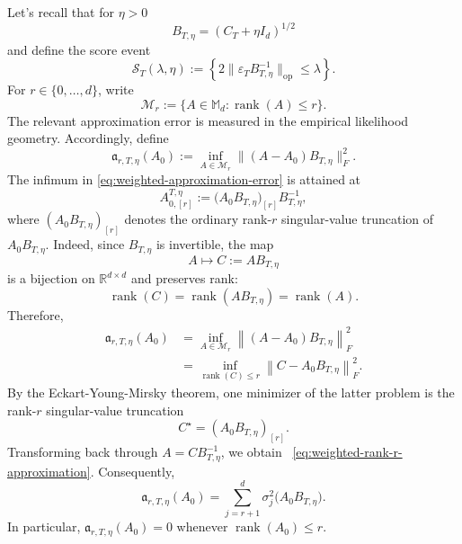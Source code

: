 \documentclass[11pt]{article}
\begin{document}
Let's recall that for $\eta>0$ 
\[
    B_{T,\eta}=(C_T+\eta I_d)^{1/2}
\]
and define the score event
\begin{equation}
    \mathcal S_T(\lambda,\eta)
    :=
    \left\{
        2\big\|\varepsilon_TB_{T,\eta}^{-1}\big\|_{\mathrm{op}}
        \leq\lambda
    \right\}.
\label{eq:score-event}
\end{equation}
For $r\in\{0,\ldots,d\}$, write
\[
    \mathcal M_r
    :=\big\{A\in\mathbb M_d:\operatorname{rank}(A)\leq r\big\}.
\]
The relevant approximation error is measured in the empirical likelihood
geometry. Accordingly, define
\begin{equation}
    \mathfrak a_{r,T,\eta}(A_0)
    :=
    \inf_{A\in\mathcal M_r}
    \big\|(A-A_0)B_{T,\eta}\big\|_F^2.
\label{eq:weighted-approximation-error}
\end{equation}
The infimum in
\eqref{eq:weighted-approximation-error} is attained at
\begin{equation}
    A_{0,[r]}^{T,\eta}
    :=
    \big(A_0B_{T,\eta}\big)_{[r]}B_{T,\eta}^{-1},
\label{eq:weighted-rank-r-approximation}
\end{equation}
where $(A_0B_{T,\eta})_{[r]}$ denotes the ordinary rank-$r$ singular-value
truncation of $A_0B_{T,\eta}$. 
Indeed, since \(B_{T,\eta}\) is invertible, the map
\[
A \longmapsto C:=AB_{T,\eta}
\]
is a bijection on \(\mathbb{R}^{d\times d}\) and preserves rank:
\begin{equation}\label{eq:rank_preservation_pr}
\operatorname{rank}(C)
=
\operatorname{rank}(AB_{T,\eta})
=
\operatorname{rank}(A).
\end{equation}
Therefore,
\[
\begin{aligned}
\mathfrak a_{r,T,\eta}(A_0)
&=
\inf_{A\in\mathcal M_r}
\left\|(A-A_0)B_{T,\eta}\right\|_F^2 \\
&=
\inf_{\operatorname{rank}(C)\le r}
\left\|C-A_0B_{T,\eta}\right\|_F^2.
\end{aligned}
\]
By the Eckart-Young-Mirsky theorem, one minimizer of the latter
problem is the rank-\(r\) singular-value truncation
\[
C^\star=(A_0B_{T,\eta})_{[r]}.
\]
Transforming back through \(A=CB_{T,\eta}^{-1}\), we obtain ~\eqref{eq:weighted-rank-r-approximation}.
Consequently, 
\begin{equation}
    \mathfrak a_{r,T,\eta}(A_0)
    =
    \sum_{j=r+1}^d\sigma_j^2\big(A_0B_{T,\eta}\big).
\label{eq:weighted-tail-singular-values}
\end{equation}
In particular, $\mathfrak a_{r,T,\eta}(A_0)=0$ whenever
$\operatorname{rank}(A_0)\leq r$.
\end{document}
